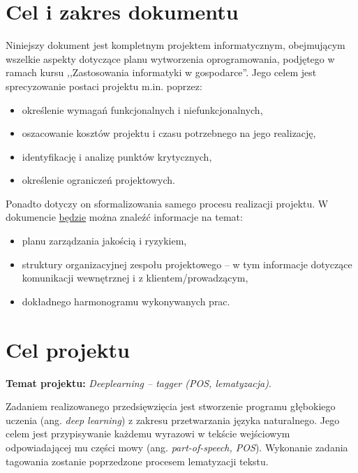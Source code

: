 \documentclass[a4paper, 11pt]{article}
\begin{document}
	\newpage{}
	
	\tableofcontents
	
	\newpage{}
	
	\section{Cel i zakres dokumentu}
	
	Niniejszy dokument jest kompletnym projektem informatycznym, obejmującym wszelkie aspekty dotyczące planu wytworzenia oprogramowania, podjętego w ramach kursu ,,Zastosowania informatyki w gospodarce''. Jego celem jest sprecyzowanie postaci projektu m.in. poprzez:
	
	\medskip
	\begin{itemize}
		\item określenie wymagań funkcjonalnych i niefunkcjonalnych,
		\item oszacowanie kosztów projektu i czasu potrzebnego na jego realizację,
		\item identyfikację i analizę punktów krytycznych,
		\item określenie ograniczeń projektowych.
	\end{itemize}
	\medskip
	
	\noindent Ponadto dotyczy on sformalizowania samego procesu realizacji projektu. W dokumencie \underline{będzie} można znaleźć informacje na temat:
	
	\medskip
	\begin{itemize}
		\item planu zarządzania jakością i ryzykiem,
		\item struktury organizacyjnej zespołu projektowego -- w tym informacje dotyczące komunikacji wewnętrznej i z klientem/prowadzącym,
		\item dokładnego harmonogramu wykonywanych prac.
	\end{itemize}
	
	\section{Cel projektu}
	
	\textbf{Temat projektu:} {\large \textit{Deeplearning -- tagger (POS, lematyzacja)}.}
	\medskip
	
	Zadaniem realizowanego przedsięwzięcia jest stworzenie programu głębokiego uczenia (ang. \textit{deep learning}) z zakresu przetwarzania języka naturalnego. Jego celem jest przypisywanie każdemu wyrazowi w tekście wejściowym odpowiadającej mu części mowy (ang. \textit{part-of-speech, POS}). Wykonanie zadania tagowania zostanie poprzedzone procesem lematyzacji tekstu.
	
\end{document}
